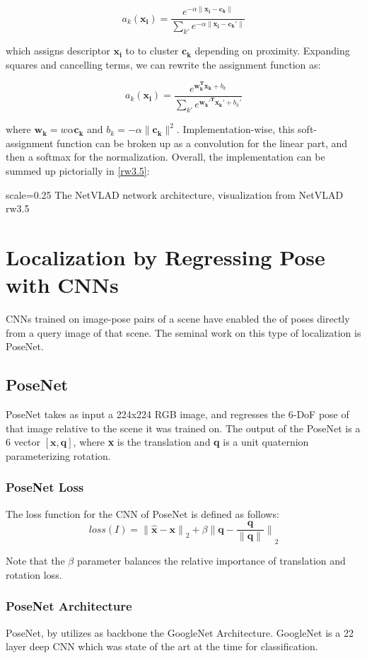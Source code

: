 \[a_k(\mathbf{x_i}) = \frac{e^{-\alpha\|\mathbf{x_i - c_k}\|}}{\sum_{k'}e^{-\alpha\|\mathbf{x_i - c_k'}\|}}\]

which assigns descriptor $\mathbf{x_i}$ to to cluster $\mathbf{c_k}$ depending on proximity. Expanding squares and cancelling terms, we can rewrite the assignment
function as:

\[a_k(\mathbf{x_i}) = \frac{e^{\mathbf{w_k^T x_k} + b_k}}{\sum_{k'}e^{\mathbf{w_k'^T x_k'} + b_k'}}\]

where $\mathbf{w_k} = w\alpha\mathbf{c_k}$ and $b_k = -\alpha\|\mathbf{c_k}\|^2$. Implementation-wise, this soft-assignment function can be broken up as a convolution
for the linear part, and then a softmax for the normalization. Overall, the implementation can be summed up pictorially in \ref{rw3.5}:

{scale=0.25}%
{The NetVLAD network architecture, visualization from \cite{Arandlejovic2015}}%
{NetVLAD}%
{rw3.5} %

\section{Localization by Regressing Pose with CNNs}
CNNs trained on image-pose pairs of a scene have enabled the  of poses directly from a query image of that scene. The seminal work on this type of localization is PoseNet.

\subsection{PoseNet}
PoseNet takes as input a 224x224 RGB image, and regresses the 6-DoF pose of that image relative to the scene it was trained on. The output of the PoseNet is a 6 vector $[\mathbf{x}, \mathbf{q}]$, where \textbf{x} is the translation and \textbf{q} is a unit quaternion parameterizing rotation. 

\subsubsection{PoseNet Loss}
The loss function for the CNN of PoseNet is defined as follows:
\[loss(I) = \mathbf{\|\hat{x} - x\|}_2 + \beta\mathbf{\|q - \dfrac{q}{\|q\|}\|}_2\]

Note that the $\beta$ parameter balances the relative importance of translation and rotation loss.

\subsubsection{PoseNet Architecture}
PoseNet, by \cite{Kendall2015} utilizes as backbone the GoogleNet Architecture. GoogleNet is a 22 layer deep CNN which was state of the art at the time for classification.

